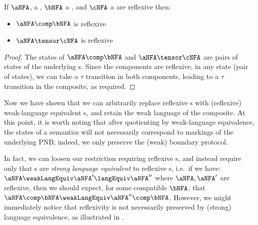 \begin{lemma}
    If $\aNFA$, a \NFAB{\aN}{\bN}, $\bNFA$ a \NFAB{\bN}{\cN}, and $\cNFA$ a
    \NFAB{\cN}{\dN} are reflexive then:
    \begin{itemize}
        \item $\aNFA \comp \bNFA$ is reflexive
        \item $\aNFA \tensor \cNFA$ is reflexive
    \end{itemize}
\end{lemma}
\begin{proof}
    The states of $\aNFA \comp \bNFA$ and $\aNFA \tensor \cNFA$ are pairs of
    states of the underlying \TNFA{}s. Since the components are reflexive, in
    any state (pair of states), we can take a $\tau$ transition in both
    components, leading to a $\tau$ transition in the composite, as required.
\end{proof}

Now we have shown that we can arbitrarily replace reflexive \TNFA{}s with
(reflexive) weak-language equivalent \TNFA{}s, and retain the weak language of
the composite. At this point, it is worth noting that after quotienting by
weak-language equivalence, the states of a \TNFA{} semantics will not
necessarily correspond to markings of the underlying PNB; indeed, we only
preserve the (weak) boundary protocol.

In fact, we can loosen our restriction requiring reflexive \TNFA{}s, and
instead require only that \TNFA{}s are \emph{strong language equivalent} to
reflexive \TNFA{}s, i.e.\ if we have: $\aNFA \weakLangEquiv \aNFA' \langEquiv
\aNFA''$ where $\aNFA, \aNFA'$ are reflexive, then we should expect, for
some compatible $\bNFA$, that $\aNFA \comp \bNFA \weakLangEquiv \aNFA'' \comp
\bNFA$. However, we might immediately notice that reflexivity is not
necessarily preserved by (strong) language equivalence, as illustrated in
.

